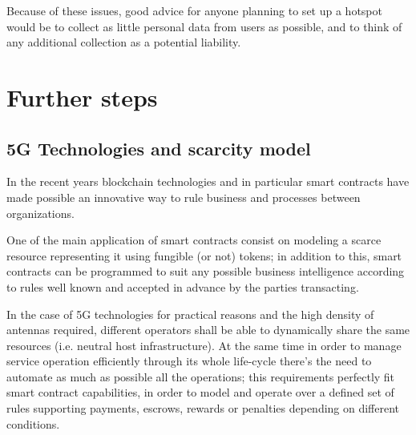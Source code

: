 \documentclass[12pt]{amsart}
\begin{document}
\begin{multicols}{2}
\vspace{0.35cm} Because of these issues, good advice for anyone
planning to set up a hotspot would be to collect as little personal
data from users as possible, and to think of any additional collection
as a potential liability.

\section{Further steps}

\subsection{5G Technologies and scarcity model}
\vspace{0.35cm}

In the recent years blockchain technologies
and in particular smart contracts have made possible
an innovative way to rule business and
processes between organizations.

\vspace{0.35cm}

One of the main application of smart contracts
consist on modeling a scarce resource representing
it using fungible (or not) tokens; in addition
to this, smart contracts can be programmed
to suit any possible business intelligence
according to rules well known and accepted
in advance by the parties transacting.

\vspace{0.35cm}

In the case of 5G technologies for practical reasons
and the high density of antennas required,
different operators shall be able
to dynamically share the same resources (i.e. neutral host
infrastructure). At the same time in order to manage
service operation efficiently through its whole
life-cycle there's the need to automate as much as
possible all the operations; this requirements
perfectly fit smart contract capabilities, in order
to model and operate over a defined set of rules
supporting payments, escrows, rewards or penalties
depending on different conditions.

\end{multicols}
\end{document}
